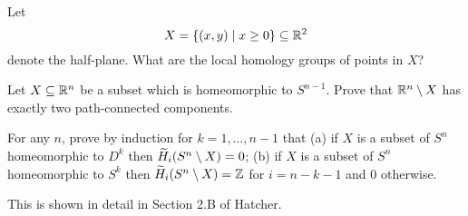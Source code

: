 \begin{problem}
	Let \[ X = \{(x,y) \mid x \ge 0\} \subseteq \mathbb R^2 \]
	denote the half-plane.
	What are the local homology groups of points in $X$?
\end{problem}

\begin{problem}
	\yod
	Let $X \subseteq \mathbb R^n$ be a subset
	which is homeomorphic to $S^{n-1}$.
	Prove that $\mathbb R^n \setminus X$
	has exactly two path-connected components.
	\begin{hint}
		For any $n$, prove by induction for $k=1,\dots,n-1$ that
		(a) if $X$ is a subset of $S^n$ homeomorphic to $D^k$
		then $\widetilde H_i(S^n \setminus X) = 0$;
		(b) if $X$ is a subset of $S^n$ homeomorphic to $S^k$
		then $\widetilde H_i(S^n \setminus X) = \mathbb Z$ for $i=n-k-1$
		and $0$ otherwise.
	\end{hint}
	\begin{sol}
		This is shown in detail in Section 2.B of Hatcher.
	\end{sol}
\end{problem}
